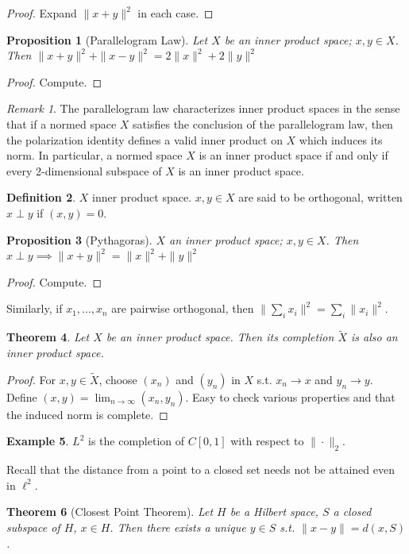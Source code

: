 \documentclass{article}
\theoremstyle{definition}
\newtheorem{defn}{Definition}[section]
\newtheorem{example}[defn]{Example}
\theoremstyle{remark}
\newtheorem{rem}{Remark}
\theoremstyle{plain}
\newtheorem{thm}[defn]{Theorem}
\newtheorem{prop}[defn]{Proposition}
\begin{document}
\begin{proof}
    Expand $\|x+y\|^2$ in each case.
\end{proof}
\begin{prop}[Parallelogram Law]
    Let $X$ be an inner product space; $x,y\in X$. Then $\|x+y\|^2+\|x-y\|^2=2\|x\|^2+2\|y\|^2$
\end{prop}
\begin{proof}
    Compute.
\end{proof}
\begin{rem}
    The parallelogram law characterizes inner product spaces in the sense that if a normed space $X$ satisfies the conclusion of the parallelogram law, then the polarization identity defines a valid inner product on $X$ which induces its norm. In particular, a normed space $X$ is an inner product space if and only if every 2-dimensional subspace of $X$ is an inner product space.
\end{rem}
\begin{defn}
    $X$ inner product space. $x,y\in X$ are said to be orthogonal, written $x\perp y$ if $(x,y)=0$.
\end{defn}
\begin{prop}[Pythagoras]
    $X$ an inner product space; $x,y\in X$. Then $x\perp y\implies \|x+y\|^2=\|x\|^2+\|y\|^2$
\end{prop}
\begin{proof}
    Compute.
\end{proof}
Similarly, if $x_1,...,x_n$ are pairwise orthogonal, then $\|\sum_ix_i\|^2=\sum_i\|x_i\|^2$.
\begin{thm}
    Let $X$ be an inner product space. Then its completion $\tilde X$ is also an inner product space.
\end{thm}
\begin{proof}
    For $x,y\in\tilde X$, choose $(x_n)$ and $(y_n)$ in $X$ s.t. $x_n\to x$ and $y_n\to y$. Define $(x,y)=\lim_{n\to\infty}(x_n,y_n)$. Easy to check various properties and that the induced norm is complete.
\end{proof}
\begin{example}
    $L^2$ is the completion of $C[0,1]$ with respect to $\|\cdot\|_2$.
\end{example}
Recall that the distance from a point to a closed set needs not be attained even in $\ell^2$.
\begin{thm}[Closest Point Theorem]
    Let $H$ be a Hilbert space, $S$ a closed subspace of $H$, $x\in H$. Then there exists a unique $y\in S$ s.t. $\|x-y\|=d(x,S)$.
\end{thm}
\end{document}
